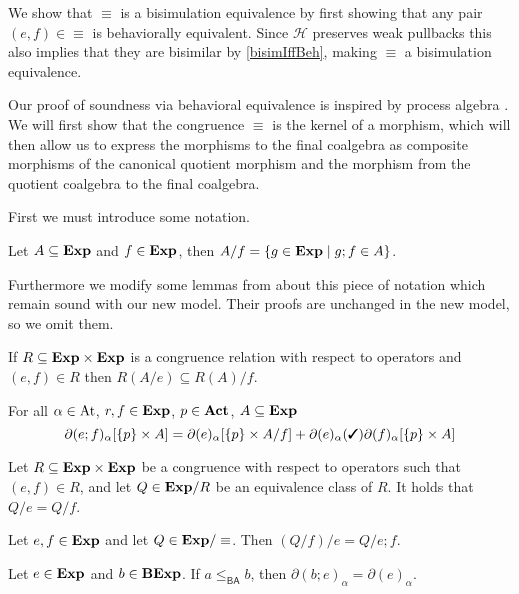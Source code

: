 \documentclass[a4paper,UKenglish,cleveref, autoref, thm-restate]{lipics-v2021}
\newcommand{\cmark}{\text{\ding{51}}}
\newcommand{\Act}{\textbf{\upshape{Act}}}
\newcommand{\At}{\text{\upshape{At}}}
\newcommand{\Exp}{\textbf{\upshape{Exp}}}
\newcommand{\BA}{\textsf{BA}}
\newcommand{\BExp}{\textbf{\upshape{BExp}}}
\newcommand{\wgkat}{\textsf{\upshape{wGKAT}}\xspace}
\newcommand{\probgkat}{\textsf{\upshape{ProbGKAT}}\xspace}
\theoremstyle{plain}\newtheoremrep{thm}{Theorem}[section]
\begin{document}
	\begin{toappendix}
		We show that $\equiv$ is a bisimulation equivalence by first showing that any pair ${(e,f)} \in {\equiv}$ is behaviorally equivalent. Since $\mathcal H$ preserves weak pullbacks this  also implies that they are bisimilar by \cref{bisimIffBeh}, making $\equiv$ a bisimulation equivalence.
		
		Our proof of soundness via behavioral equivalence is inspired by process algebra \cite{ToddThesis}. We will first show that the congruence $\equiv$ is the kernel of a morphism, which will then allow us to express the morphisms to the final coalgebra as composite morphisms of the canonical quotient morphism and the morphism from the quotient coalgebra to the final coalgebra.
		
		First we must introduce some notation.
		\begin{defn}
			Let $A \subseteq \Exp$ and $f \in \Exp$, then $A/f = \{g \in \Exp \mid g;f \in A\}$.
		\end{defn}
		Furthermore we modify some lemmas from \probgkat about this piece of notation which remain sound with our new model. Their proofs are unchanged in the new model, so we omit them. 
		\begin{lem}
			If $R \subseteq \Exp \times \Exp$ is a congruence relation with respect to \wgkat operators and $(e,f) \in R$ then $R(A/e) \subseteq R(A)/f$.
			\label{lem41}
		\end{lem}
		\begin{lem}
			For all $\alpha \in \At$, $r,f \in \Exp$, $p \in \Act$, $A \subseteq \Exp$
			$$\partial(e;f)_\alpha[\{p\} \times A] = \partial(e)_\alpha[\{p\} \times A/f] + \partial(e)_\alpha(\cmark)\partial(f)_\alpha[\{p\}\times A]$$
			\label{lem42}
		\end{lem}
		\begin{lem} \label{lem45}
			Let $R \subseteq \Exp \times \Exp$ be a congruence with respect to \wgkat operators such that $(e,f) \in R$, and let $Q \in \Exp/R$ be an equivalence class of $R$. It holds that $Q/e = Q/f$.
		\end{lem}
		\begin{lem}
			Let $e,f \in \Exp$ and let $Q \in \Exp/\equiv$. Then $(Q/f)/e = Q/e;f$.  \label{lem46}
		\end{lem}
		\begin{lem}
			Let $e \in \Exp$ and $b \in \BExp$. If $a \leq_{\BA} b$, then $\partial(b;e)_\alpha = \partial(e)_\alpha$. \label{lem48}
		\end{lem}
		

\end{toappendix}
\end{document}
